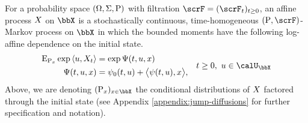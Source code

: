 \begin{definition}
  \label{definition:affine-process}
  For a probability space $(\Omega, \Sigma, {\operatorname{P}})$ with filtration $\scrF = (\scrF_t)_{t\geq0}$, an affine process $X$ on $\stateSpace$ is a stochastically continuous, time-homogeneous $(\Prb, \scrF)$-Markov process on $\stateSpace$ in which the bounded moments have the following log-affine dependence on the initial state.
  \begin{align}
    \label{eq:affine-definition}
    &\begin{aligned}
      \Exp_{\Prb_\stateVar}\exp\prj{\momentVar}{\X_t} &= \exp\aff(t, \momentVar, \stateVar) \\
      \aff(t, \momentVar, \stateVar) &= \affPart_0(t, \momentVar) + \bprj{\affPart(t, \momentVar)}{\stateVar},  \\
    \end{aligned}
    & t \geq 0, ~ \momentVar \in \boundedSpace
  \end{align}
  Above, we are denoting $(\Prb_\stateVar)_{\stateVar\in\stateSpace}$ the conditional distributions of $X$ factored through the initial state (see Appendix \ref{appendix:jump-diffusions} for further specification and notation).
\end{definition}
